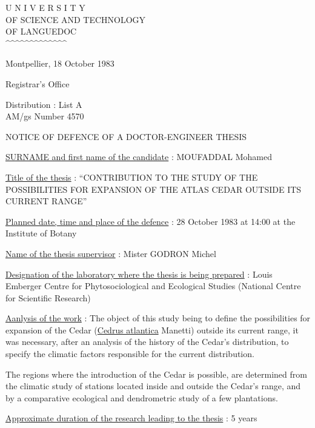 
\begin{center}
U N I V E R S I T Y\\
OF SCIENCE AND TECHNOLOGY\\
OF LANGUEDOC\\
\textasciicircum\textasciicircum\textasciicircum\textasciicircum\textasciicircum\textasciicircum\textasciicircum\textasciicircum\textasciicircum\textasciicircum\textasciicircum\textasciicircum\textasciicircum
\end{center}

Montpellier, 18 October 1983

Registrar's Office

Distribution : List A\\
AM/gs \hfill Number 4570

\begin{center}
NOTICE OF DEFENCE OF A DOCTOR-ENGINEER THESIS

\end{center}

\uline{SURNAME and first name of the candidate} : MOUFADDAL Mohamed

\uline{Title of the thesis} : ``CONTRIBUTION TO THE STUDY OF THE POSSIBILITIES FOR EXPANSION OF THE ATLAS CEDAR OUTSIDE ITS CURRENT RANGE''

\uline{Planned date, time and place of the defence} : 28 October 1983 at 14:00 at the Institute of Botany

\uline{Name of the thesis supervisor} : Mister GODRON Michel

\uline{Designation of the laboratory where the thesis is being prepared} : Louis Emberger Centre for Phytosociological and Ecological Studies (National Centre for Scientific Research)

\uline{Aanlysis of the work} : The object of this study being to define the possibilities for expansion of the Cedar (\uline{Cedrus atlantica} Manetti) outside its current range, it was necessary, after an analysis of the history of the Cedar's distribution, to specify the climatic factors responsible for the current distribution.

The regions where the introduction of the Cedar is possible, are determined from the climatic study of stations located inside and outside the Cedar's range, and by a comparative ecological and dendrometric study of a few plantations.

\uline{Approximate duration of the research leading to the thesis} : 5 years

